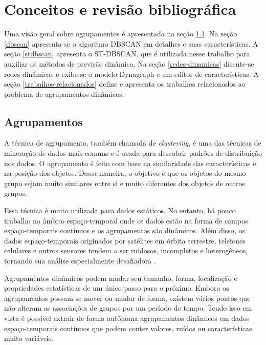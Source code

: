 \chapter{Conceitos e revisão bibliográfica}
\label{cap:estadodaarte}

Uma visão geral sobre agrupamentos é apresentada na seção \ref{agrupamentos}. Na seção \ref{dbscan} apresenta-se o algoritmo DBSCAN em detalhes e suas características. A seção \ref{stdbscan} apresenta o ST-DBSCAN, que é utilizada nesse trabalho para auxiliar os métodos de previsão dinâmica. Na seção  \ref{redes-dinamicas}  discute-se redes dinâmicas e exibe-se o modelo Dynagraph e um editor de características. A seção  \ref{trabalhos-relacionados}  define e apresenta os trabalhos relacionados ao problema de agrupamentos dinâmicos.


\section{Agrupamentos}
\label{agrupamentos}

A técnica de agrupamento, também chamada de \textit{clustering}, é uma das técnicas de mineração de dados mais comuns e é usada para descobrir padrões de distribuição nos dados. O agrupamento é feito com base na similaridade das características e na posição dos objetos. Dessa maneira, o objetivo é que os objetos do mesmo grupo sejam muito similares entre si e muito diferentes dos objetos de outros grupos.

Essa técnica é muito utilizada para dados estáticos. No entanto, há pouco trabalho no âmbito espaço-temporal onde os dados estão na forma de campos espaço-temporais contínuos e os agrupamentos são dinâmicos. Além disso, os dados espaço-temporais originados por satélites em órbita terrestre, telefones celulares e outros sensores tendem a ser ruidosos, incompletos e heterogêneos, tornando sua análise especialmente desafiadora \cite{faghmous2013}.

Agrupamentos dinâmicos podem mudar seu tamanho, forma, localização e propriedades estatísticas de um único passo para o próximo. Embora os agrupamentos possam se mover ou mudar de forma, existem vários pontos que não alteram as associações de grupos por um período de tempo. Tendo isso em vista é possível extrair de forma autônoma agrupamentos dinâmicos em dados espaço-temporais contínuos que podem conter valores, ruídos ou características muito variáveis.

